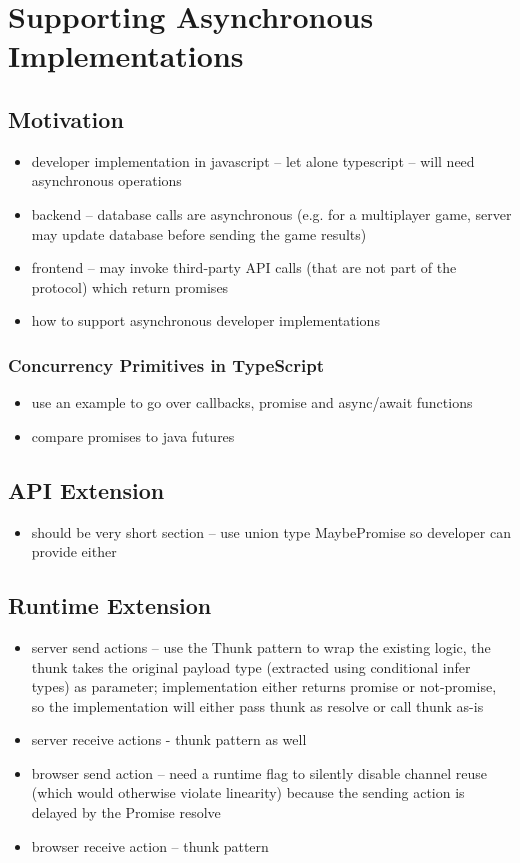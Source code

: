 \section{Supporting Asynchronous Implementations}

\subsection{Motivation}

\begin{itemize}
\item developer implementation in javascript -- let alone typescript -- will need asynchronous operations
\item backend -- database calls are asynchronous (e.g. for a multiplayer game, server may update database before sending the game results)
\item frontend -- may invoke third-party API calls (that are not part of the protocol) which return promises
\item how to support asynchronous developer implementations
\end{itemize}

\subsubsection{Concurrency Primitives in TypeScript}
\begin{itemize}
\item use an example to go over callbacks, promise and async/await functions
\item compare promises to java futures
\end{itemize}

\subsection{API Extension}
\begin{itemize}
\item should be very short section -- use union type MaybePromise so developer can provide either
\end{itemize}

\subsection{Runtime Extension}
\begin{itemize}
\item server send actions -- use the Thunk pattern to wrap the existing logic, the thunk takes the original payload type (extracted using conditional infer types) as parameter; implementation either returns promise or not-promise, so the implementation will either pass thunk as resolve or call thunk as-is
\item server receive actions - thunk pattern as well
\item browser send action -- need a runtime flag to silently disable channel reuse (which would otherwise violate linearity) because the sending action is delayed by the Promise resolve
\item browser receive action -- thunk pattern
\end{itemize}

